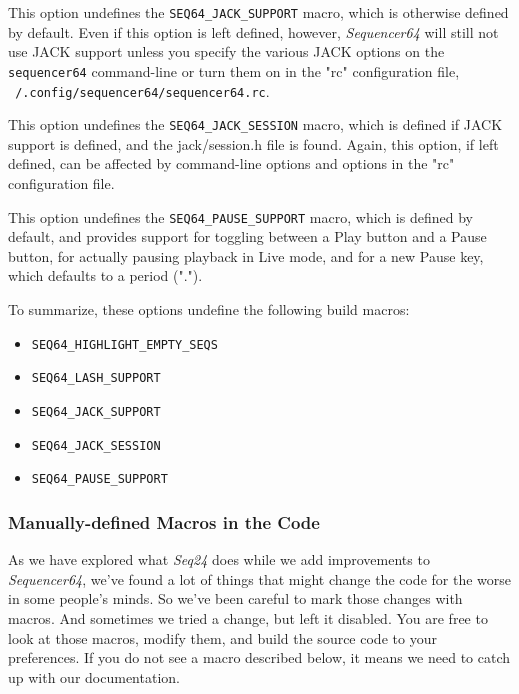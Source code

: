         This option undefines the \texttt{SEQ64\_JACK\_SUPPORT} macro, which is
        otherwise defined by default.  Even if this option is left defined,
        however, \textsl{Sequencer64} will still not use JACK support unless
        you specify the various JACK options on the \texttt{sequencer64}
        command-line or turn them on in the "rc" configuration file,
        \texttt{~/.config/sequencer64/sequencer64.rc}.

        This option undefines the \texttt{SEQ64\_JACK\_SESSION} macro, which is
        defined if JACK support is defined, and the jack/session.h file is
        found.  Again, this option, if left defined, can be affected by
        command-line options and options in the "rc" configuration file.

        This option undefines the \texttt{SEQ64\_PAUSE\_SUPPORT} macro,
        which is defined by default, and provides support for toggling between
        a Play button and a Pause button, for actually pausing playback
        in Live mode, and for a new Pause key, which defaults to a
        period (".").

    To summarize, these options undefine the following build macros:

      \begin{itemize}
        \item \texttt{SEQ64\_HIGHLIGHT\_EMPTY\_SEQS}
        \item \texttt{SEQ64\_LASH\_SUPPORT}
        \item \texttt{SEQ64\_JACK\_SUPPORT}
        \item \texttt{SEQ64\_JACK\_SESSION}
        \item \texttt{SEQ64\_PAUSE\_SUPPORT}
      \end{itemize}

\subsubsection{Manually-defined Macros in the Code}
\label{subsubsec:seq64_build_macros}

   As we have explored what \textsl{Seq24} does while we add improvements to
   \textsl{Sequencer64}, we've found a lot of things that might change the code
   for the worse in some people's minds.  So we've been careful to mark those
   changes with macros.  And sometimes we tried a change, but left it
   disabled.  You are free to look at those macros, modify them, and build
   the source code to your preferences.  If you do not see a macro described
   below, it means we need to catch up with our documentation.

